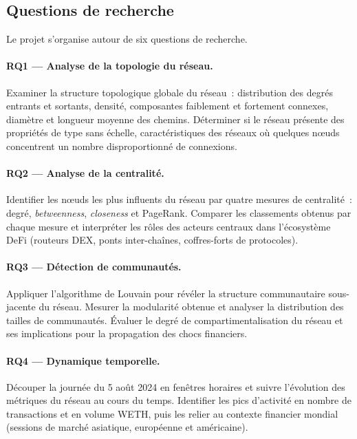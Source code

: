 \subsection{Questions de recherche}
\label{sec:description_rq}

Le projet s'organise autour de six questions de recherche.

\paragraph{RQ1 --- Analyse de la topologie du r\'eseau.}
Examiner la structure topologique globale du r\'eseau~: distribution des degr\'es
entrants et sortants, densit\'e, composantes faiblement et fortement connexes,
diam\`etre et longueur moyenne des chemins. D\'eterminer si le r\'eseau pr\'esente
des propri\'et\'es de type sans \'echelle, caract\'eristiques des r\'eseaux o\`u
quelques n\oe{}uds concentrent un nombre disproportionn\'e de connexions.

\paragraph{RQ2 --- Analyse de la centralit\'e.}
Identifier les n\oe{}uds les plus influents du r\'eseau par quatre mesures de
centralit\'e~: degr\'e, \textit{betweenness}, \textit{closeness} et PageRank.
Comparer les classements obtenus par chaque mesure et interpr\'eter les r\^oles
des acteurs centraux dans l'\'ecosyst\`eme DeFi (routeurs DEX, ponts
inter-cha\^ines, coffres-forts de protocoles).

\paragraph{RQ3 --- D\'etection de communaut\'es.}
Appliquer l'algorithme de Louvain pour r\'ev\'eler la structure communautaire
sous-jacente du r\'eseau. Mesurer la modularit\'e obtenue et analyser la
distribution des tailles de communaut\'es. \'Evaluer le degr\'e de
compartimentalisation du r\'eseau et ses implications pour la propagation des
chocs financiers.

\paragraph{RQ4 --- Dynamique temporelle.}
D\'ecouper la journ\'ee du 5 ao\^ut 2024 en fen\^etres horaires et suivre
l'\'evolution des m\'etriques du r\'eseau au cours du temps. Identifier les pics
d'activit\'e en nombre de transactions et en volume WETH, puis les relier au
contexte financier mondial (sessions de march\'e asiatique, europ\'eenne et
am\'ericaine).

